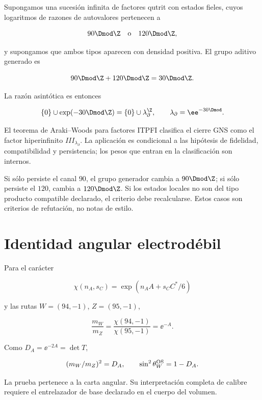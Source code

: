 Supongamos una sucesi\'on infinita de factores qutrit con estados fieles, cuyos logaritmos de razones de autovalores pertenecen a

\[
90\Dmod\Z\quad\text{o}\quad120\Dmod\Z,
\]

y supongamos que ambos tipos aparecen con densidad positiva. El grupo aditivo generado es

\[
90\Dmod\Z+120\Dmod\Z=30\Dmod\Z.
\]

La raz\'on asint\'otica es entonces

\[
\{0\}\cup\exp(-30\Dmod\Z)
=\{0\}\cup\lambda_\partial^\Z,
\qquad \lambda_\partial=\ee^{-30\Dmod}.
\]

El teorema de Araki--Woods para factores ITPFI clasifica el cierre GNS como el factor hiperinfinito \(III_{\lambda_\partial}\). La aplicaci\'on es condicional a las hip\'otesis de fidelidad, compatibilidad y persistencia; los pesos que entran en la clasificaci\'on son internos.

\begin{remark}
Si s\'olo persiste el canal \(90\), el grupo generador cambia a \(90\Dmod\Z\); si s\'olo persiste el \(120\), cambia a \(120\Dmod\Z\). Si los estados locales no son del tipo producto compatible declarado, el criterio debe recalcularse. Estos casos son criterios de refutación, no notas de estilo.
\end{remark}


\section{Identidad angular electrod\'ebil}

Para el car\'acter

\[
\chi(n_A,s_C)=\exp(n_AA+s_CC^*/6)
\]

y las rutas \(W=(94,-1)\), \(Z=(95,-1)\),

\[
\frac{m_W}{m_Z}=\frac{\chi(94,-1)}{\chi(95,-1)}
=\ee^{-A}.
\]

Como \(D_A=\ee^{-2A}=\det T\),

\[
(m_W/m_Z)^2=D_A,\qquad
\sin^2\theta_W^{\rm OS}=1-D_A.
\]

La prueba pertenece a la carta angular. Su interpretaci\'on completa de
calibre requiere el entrelazador de base declarado en el cuerpo del volumen.
